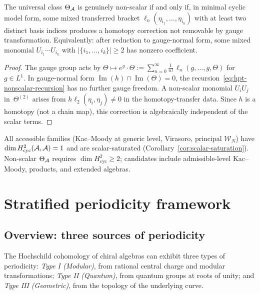 \begin{proposition}
\label{prop:non-scalar-criterion}
The universal class $\Theta_{\mathcal{A}}$ is genuinely non-scalar
if and only if, in minimal cyclic model form, some mixed
transferred bracket
$\ell_n(\eta_{i_1}, \ldots, \eta_{i_n})$ with at least two
distinct basis indices produces a homotopy correction not
removable by gauge transformation.
Equivalently: after reduction to gauge-normal form,
some mixed monomial
$U_{i_1} \cdots U_{i_k}$ with $|\{i_1, \ldots, i_k\}| \geq 2$
has nonzero coefficient.
\end{proposition}

\begin{proof}
The gauge group acts by
$\Theta \mapsto e^{g} \cdot \Theta :=
\sum_{n=0}^\infty \frac{1}{n!}\, \ell_n(g, \ldots, g, \Theta)$
for $g \in L^1$.  In gauge-normal form
$\operatorname{Im}(h) \cap \operatorname{Im}(\Theta) = 0$,
the recursion~\eqref{eq:hpt-nonscalar-recursion} has no
further gauge freedom.  A non-scalar monomial $U_i U_j$
in~$\Theta^{(2)}$ arises from
$h\ell_2(\eta_i, \eta_j) \neq 0$ in the homotopy-transfer
data.  Since $h$ is a homotopy (not a chain map), this
correction is algebraically independent of the scalar terms.
\end{proof}

\begin{remark}
\label{rem:non-scalar-landscape}
All accessible families (Kac--Moody at generic level, Virasoro, principal $\mathcal{W}_N$) have $\dim H^2_{\mathrm{cyc}}(\mathcal{A},\mathcal{A}) = 1$ and are scalar-saturated (Corollary~\ref{cor:scalar-saturation}).  Non-scalar $\Theta_{\mathcal{A}}$ requires $\dim H^2_{\mathrm{cyc}} \geq 2$; candidates include admissible-level Kac--Moody, products, and extended algebras.
\end{remark}

\section{Stratified periodicity framework}

\subsection{Overview: three sources of periodicity}

The Hochschild cohomology of chiral algebras can exhibit three types of periodicity: \emph{Type I (Modular)}, from rational central charge and modular transformations; \emph{Type II (Quantum)}, from quantum groups at roots of unity; and \emph{Type III (Geometric)}, from the topology of the underlying curve.

